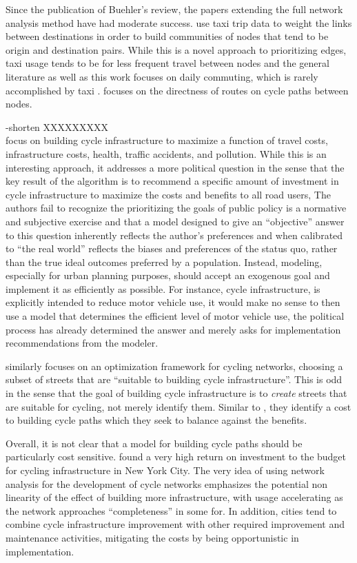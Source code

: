 Since the publication of Buehler's review, the papers extending the full network analysis method have had moderate success. \textcite{akbarzadeh2018designing} use taxi trip data to weight the links between destinations in order to build communities of nodes that tend to be origin and destination pairs. While this is a novel approach to prioritizing edges, taxi usage tends to be for less frequent travel between nodes and the general literature as well as this work focuses on daily commuting, which is rarely accomplished by taxi \parencite{jtw}. \textcite{boisjoly2019bicycle} focuses on the directness of routes on cycle paths between nodes. 

-shorten XXXXXXXXX\\
\textcite{doorley2019designing} focus on building cycle infrastructure to maximize a function of travel costs, infrastructure costs, health, traffic accidents, and pollution. While this is an interesting approach, it addresses a more political question in the sense that the key result of the algorithm is to recommend a specific amount of investment in cycle infrastructure to maximize the costs and benefits to all road users, The authors fail to recognize the prioritizing the goals of public policy is a normative and subjective exercise and that a model designed to give an ``objective'' answer to this question inherently reflects the author's preferences and when calibrated to ``the real world'' reflects the biases and preferences of the status quo, rather than the true ideal outcomes preferred by a population. Instead, modeling, especially for urban planning purposes, should accept an exogenous goal and implement it as efficiently as possible. For instance, cycle infrastructure, is explicitly intended to reduce motor vehicle use, it would make no sense to then use a model that determines the efficient level of motor vehicle use, the political process has already determined the answer and merely asks for implementation recommendations from the modeler. 

\textcite{mauttone2017bicycle} similarly focuses on an optimization framework for cycling networks, choosing a subset of streets that are ``suitable to building cycle infrastructure''. This is odd in the sense that the goal of building cycle infrastructure is to \textit{create} streets that are suitable for cycling, not merely identify them. Similar to \textcite{doorley2019designing}, they identify a cost to building cycle paths which they seek to balance against the benefits. 

Overall, it is not clear that a model for building cycle paths should be particularly cost sensitive. \textcite{gu2017cost} found a very high return on investment to the budget for cycling infrastructure in New York City. The very idea of using network analysis for the development of cycle networks emphasizes the potential non linearity of the effect of building more infrastructure, with usage accelerating as the network approaches ``completeness'' in some for. In addition, cities tend to combine cycle infrastructure improvement with other required improvement and maintenance activities, mitigating the costs by being opportunistic in implementation. 


